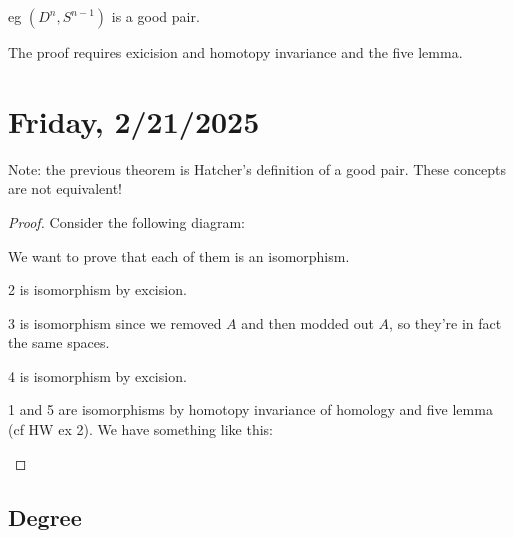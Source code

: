 \documentclass{article}
\theoremstyle{definition}
\begin{document}
    eg \((D^n, S^{n-1})\) is a good pair.

    The proof requires exicision and homotopy invariance and the five lemma.

    \section*{Friday, 2/21/2025}
    
    Note: the previous theorem is Hatcher's definition of a good pair. These concepts are not equivalent!

    \begin{proof}

        Consider the following diagram:

        \begin{center}
        \end{center}
        
        We want to prove that each of them is an isomorphism.

        2 is isomorphism by excision.

        3 is isomorphism since we removed \(A\) and then modded out \(A\), so they're in fact the same spaces.

        4 is isomorphism by excision.

        1 and 5 are isomorphisms by homotopy invariance of homology and five lemma (cf HW ex 2). We have something like this:

        \begin{center}
        \end{center}
        
    \end{proof}

    \subsection*{Degree}
\end{document}
